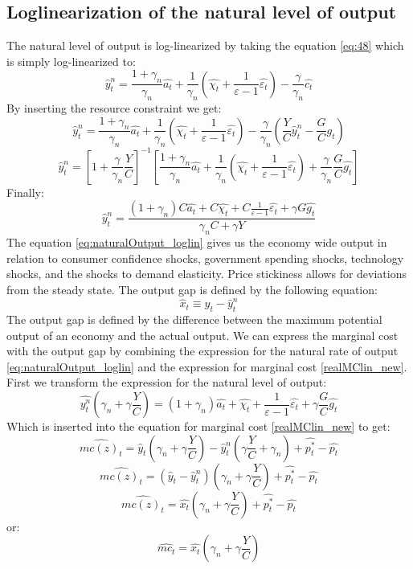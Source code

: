 \documentclass[10pt,a4paper]{article}
\begin{document}
\subsection{Loglinearization of the natural level of output}
The natural level of output is log-linearized by taking the equation \eqref{eq:48} which is simply log-linearized to:
\begin{equation}
\hat{y}_t^n= \frac{1+\gamma_n}{\gamma_n} \hat{a_t} + \frac{1}{\gamma_n}(\hat{\chi_t}+\frac{1}{\varepsilon-1}\hat{\varepsilon_t}) - \frac{\gamma}{\gamma_n}\hat{c_t}
\end{equation}
By inserting the resource constraint we get:
$$\hat{y}_t^n= \frac{1+\gamma_n}{\gamma_n} \hat{a_t} + \frac{1}{\gamma_n}(\hat{\chi_t}+\frac{1}{\varepsilon-1}\hat{\varepsilon_t}) - \frac{\gamma}{\gamma_n}\left({\frac{Y}{C}\hat{y}_t^n} - \frac{G}{C}\hat{g_t} \right)$$
$$\hat{y}_t^n =\left[ 1+ \frac{\gamma}{\gamma_n} \frac{Y}{C}\right]^{-1} \left[ \frac{1+\gamma_n}{\gamma_n} \hat{a_t} + \frac{1}{\gamma_n}(\hat{\chi_t}+\frac{1}{\varepsilon-1}\hat{\varepsilon_t}) + \frac{\gamma}{\gamma_n} \frac{G}{C}\hat{g_t} \right] $$
Finally:
\begin{equation}\label{eq:naturalOutput_loglin}
\hat{y}_t^n = \frac{(1 +\gamma_n)C \hat{a_t} + C \hat{\chi_t} +C\frac{1}{\varepsilon-1}\hat{\varepsilon_t} + \gamma G \hat{g_t}}{\gamma_n C + \gamma Y }
\end{equation}
The equation \eqref{eq:naturalOutput_loglin} gives us the economy wide output in relation to consumer confidence shocks, government spending shocks, technology shocks, and the shocks to demand elasticity. Price stickiness allows for deviations from the steady state.
The output gap is defined by the following equation:
$$ \hat{x}_t \equiv \hat{y}_t - \hat{y}_t^n$$
The output gap is defined by the difference between the maximum potential output of an economy and the actual output. We can express the marginal cost with the output gap by combining the expression for the natural rate of output \eqref{eq:naturalOutput_loglin} and the expression for marginal cost \eqref{realMClin_new}. First we transform the expression for the natural level of output:
$$\hat{y_t^n}(\gamma_n +\gamma\frac{Y}{C}) = (1+\gamma_n)\hat{a_t}+\hat{\chi_t}+\frac{1}{\varepsilon-1}\hat{\varepsilon_t}+\gamma\frac{G}{C}\hat{g_t}$$
Which is inserted into the equation for marginal cost \eqref{realMClin_new} to get:
$$\hat{mc(z)_t}=\hat{y}_t \left(\gamma_n +  \gamma \frac{Y}{C} \right) - \hat{y}_t^n \left( \gamma \frac{Y}{C} + \gamma_n\right) + \hat{p_t^*}-\hat{p_t}$$
$$\hat{mc(z)_t}=(\hat{y}_t - \hat{y}_t^n)\left(\gamma_n +  \gamma \frac{Y}{C} \right)+ \hat{p_t^*}-\hat{p_t}$$
\begin{equation}\label{eq:MC_gap_new}
\hat{mc(z)_t}=\hat{x_t}\left(\gamma_n +  \gamma \frac{Y}{C} \right)+ \hat{p_t^*}-\hat{p_t}
\end{equation}
or:
\begin{equation}\label{eq:MC_gap_old}
\hat{mc_t}=\hat{x_t}\left(\gamma_n +  \gamma \frac{Y}{C} \right)
\end{equation}
\end{document}
